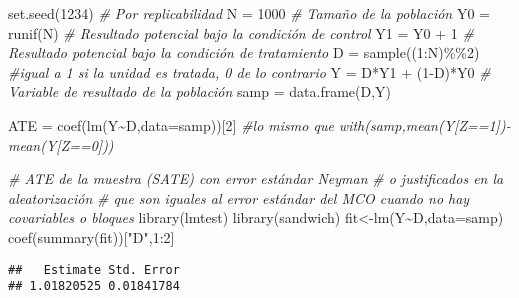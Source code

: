 \documentclass[
]{article}
\newenvironment{Shaded}{\begin{snugshade}}{\end{snugshade}}
\newcommand{\AttributeTok}[1]{\textcolor[rgb]{0.77,0.63,0.00}{#1}}
\newcommand{\CommentTok}[1]{\textcolor[rgb]{0.56,0.35,0.01}{\textit{#1}}}
\newcommand{\DecValTok}[1]{\textcolor[rgb]{0.00,0.00,0.81}{#1}}
\newcommand{\FunctionTok}[1]{\textcolor[rgb]{0.00,0.00,0.00}{#1}}
\newcommand{\NormalTok}[1]{#1}
\newcommand{\OtherTok}[1]{\textcolor[rgb]{0.56,0.35,0.01}{#1}}
\newcommand{\SpecialCharTok}[1]{\textcolor[rgb]{0.00,0.00,0.00}{#1}}
\newcommand{\StringTok}[1]{\textcolor[rgb]{0.31,0.60,0.02}{#1}}
\begin{document}
\begin{Shaded}
\begin{Highlighting}[]
\FunctionTok{set.seed}\NormalTok{(}\DecValTok{1234}\NormalTok{) }\CommentTok{\# Por replicabilidad }
\NormalTok{N }\OtherTok{=} \DecValTok{1000} \CommentTok{\# Tamaño de la población}
\NormalTok{Y0 }\OtherTok{=} \FunctionTok{runif}\NormalTok{(N) }\CommentTok{\# Resultado potencial bajo la condición de control}
\NormalTok{Y1 }\OtherTok{=}\NormalTok{ Y0 }\SpecialCharTok{+} \DecValTok{1} \CommentTok{\# Resultado potencial bajo la condición de tratamiento}
\NormalTok{D }\OtherTok{=} \FunctionTok{sample}\NormalTok{((}\DecValTok{1}\SpecialCharTok{:}\NormalTok{N)}\SpecialCharTok{\%\%}\DecValTok{2}\NormalTok{) }\CommentTok{\#igual a 1 si la unidad es tratada, 0 de lo contrario}
\NormalTok{Y }\OtherTok{=}\NormalTok{ D}\SpecialCharTok{*}\NormalTok{Y1 }\SpecialCharTok{+}\NormalTok{ (}\DecValTok{1}\SpecialCharTok{{-}}\NormalTok{D)}\SpecialCharTok{*}\NormalTok{Y0 }\CommentTok{\# Variable de resultado de la población}
\NormalTok{samp }\OtherTok{=} \FunctionTok{data.frame}\NormalTok{(D,Y) }

\NormalTok{ATE }\OtherTok{=} \FunctionTok{coef}\NormalTok{(}\FunctionTok{lm}\NormalTok{(Y}\SpecialCharTok{\textasciitilde{}}\NormalTok{D,}\AttributeTok{data=}\NormalTok{samp))[}\DecValTok{2}\NormalTok{] }\CommentTok{\#lo mismo que with(samp,mean(Y[Z==1]){-}mean(Y[Z==0])) }

\CommentTok{\# ATE de la muestra (SATE) con error estándar Neyman }
\CommentTok{\# o justificados en la aleatorización}
\CommentTok{\# que son iguales al error estándar del MCO cuando no hay covariables o bloques}
\FunctionTok{library}\NormalTok{(lmtest) }
\FunctionTok{library}\NormalTok{(sandwich) }
\NormalTok{fit}\OtherTok{\textless{}{-}}\FunctionTok{lm}\NormalTok{(Y}\SpecialCharTok{\textasciitilde{}}\NormalTok{D,}\AttributeTok{data=}\NormalTok{samp) }
\FunctionTok{coef}\NormalTok{(}\FunctionTok{summary}\NormalTok{(fit))[}\StringTok{"D"}\NormalTok{,}\DecValTok{1}\SpecialCharTok{:}\DecValTok{2}\NormalTok{]}
\end{Highlighting}
\end{Shaded}

\begin{verbatim}
##   Estimate Std. Error 
## 1.01820525 0.01841784
\end{verbatim}
\end{document}
